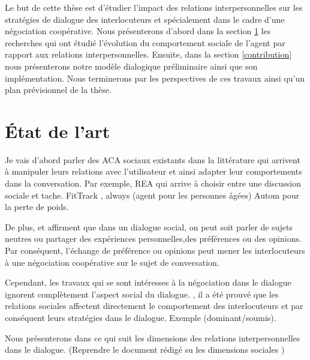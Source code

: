 \documentclass[a4paper,french]{article}
\begin{document}
\par Le but de cette thèse est d'étudier l'impact des relations interpersonnelles sur les stratégies de dialogue des interlocuteurs et spécialement dans le cadre d'une négociation coopérative. Nous présenterons d'abord dans la section \ref{RW} les recherches qui ont étudié l'évolution du comportement sociale de l'agent par rapport aux relations interpersonnelles. Ensuite, dans la section \ref{contribution} nous présenterons notre modèle dialogique préliminaire ainsi que son implémentation. Nous terminerons par les perspectives de ces travaux ainsi qu'un plan prévisionnel de la thèse.

\section{État de l'art}
\label{RW}
Je vais d'abord parler des ACA sociaux existants dans la littérature qui arrivent à manipuler leurs relations avec l'utilisateur et ainsi adapter leur comportements dans la conversation. Par exemple, REA qui arrive à choisir entre une discussion sociale et tache.
FitTrack \cite{bickmore2005s}, always \cite{sidner2013always}(agent pour les personnes âgées)
Autom pour la perte de poids.

De plus, \cite{bickmore2005social}  et \cite{laver1981linguistic} affirment que dans un dialogue social, on peut soit parler de sujets neutres ou partager des expériences personnelles,des préférences ou des opinions. Par conséquent, l’échange de préférence ou opinions peut mener les interlocuteurs à une négociation coopérative sur le sujet de conversation.


Cependant, les travaux qui se sont intéresses à la négociation \cite{amgoud2000arguments,mcburney2004denotational,daskalopulu1998handling} dans le dialogue ignorent complètement l'aspect social du dialogue. , il a été prouvé que les relations sociales affectent directement le comportement des interlocuteurs \cite{bickmore2000weather, bickmore2005establishing, moon1998intimate, nass2000does} et par conséquent leurs stratégies dans le dialogue. 
Exemple (dominant/soumis). 

Nous présenterons dans ce qui suit les dimensions des relations interpersonnelles dans le dialogue. 
(Reprendre le document rédigé su les dimensions sociales \cite {svennevig2000getting, haslam1994mental})
\end{document}
